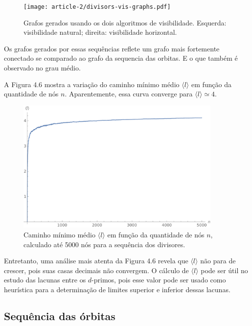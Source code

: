 \documentclass[12pt,a4paper,fleqn]{report}
\begin{document}
\begin{figure}[H]
    \centering
    \texttt{[image: article-2/divisors-vis-graphs.pdf]}
    \caption{Grafos gerados usando os dois algoritmos de visibilidade. Esquerda: visibilidade natural; 
    direita: visibilidade horizontal.}
    \label{graph-divs-vis}
\end{figure}

Os grafos gerados por essas sequências reflete um grafo mais fortemente conectado se comparado
ao grafo da sequencia das orbitas. E o que também é observado no grau médio.

A Figura 4.6 mostra a variação do caminho mínimo médio $\langle l\rangle$ em função da quantidade de nós $n$. Aparentemente, essa curva converge para $\langle l\rangle \simeq 4$.

\begin{figure}[H]
    \centering
    \includegraphics[width=0.9\textwidth]{article-2/growth-divisors.pdf}
    \caption{Caminho mínimo médio $\langle l\rangle$ em função da quantidade de nós $n$, calculado até 5000 nós para a sequência
    dos divisores.}
    \label{graph-growth}
\end{figure}

Entretanto, uma análise mais atenta da Figura 4.6 revela que $\langle l\rangle$
não para de crescer, pois  suas
casas decimais não convergem. O cálculo de $\langle l\rangle$ pode ser útil no estudo
das lacunas entre os $d$-primos, pois esse valor pode ser usado como heurística para a determinação
de limites superior e inferior dessas lacunas.


\subsection{Sequência das órbitas}
\end{document}
